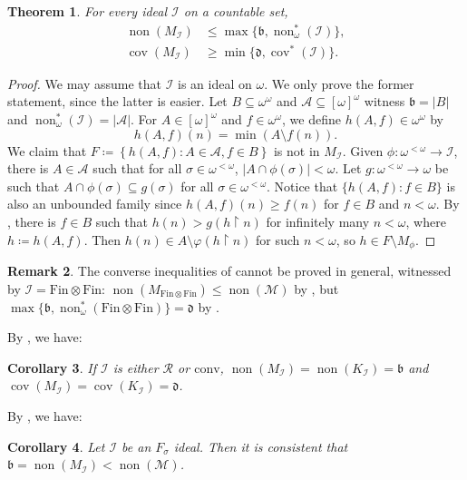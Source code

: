 \documentclass[a4paper,12pt]{amsart}
\newtheorem{thm}{Theorem}
\newtheorem{cor}[thm]{Corollary}
\theoremstyle{definition}
\newtheorem{rem}[thm]{Remark}
\numberwithin{thm}{section}
\numberwithin{equation}{section}
\newcommand{\oo}{{\omega}^\omega}
\newcommand{\ooo}{[{\omega}]^\omega}
\newcommand{\fsq}{\omega^{<\omega}}
\newcommand{\on}{\mathpunct{\upharpoonright}}
\newcommand{\bb}{\mathfrak{b}}
\newcommand{\dd}{\mathfrak{d}}
\DeclareMathOperator{\non}{non}
\DeclareMathOperator{\cov}{cov}
\newcommand{\nonm}{\non(\mathcal{M})}
\newcommand{\I}{\mathscr{I}}
\newcommand{\finfin}{\mathrm{Fin}\otimes\mathrm{Fin}}
\newcommand{\cal}{\mathcal}
\newcommand{\set}[2]
{\left\{{#1}:{#2}\right\}}  %
\newcommand{\mzb}{M}
\newcommand{\mzbi}{\mzb_{\I}}
\newcommand{\conv}{\mathrm{conv}}
\newcommand{\RandomGraph}{\mathcal{R}}
\begin{document}
    \begin{thm}\label{thm:nonmi_leq_max}
        For every ideal $\I$ on a countable set,
        \begin{align*}
            \non(M_\I) &\leq \max\{\bb,\non^*_\omega(\I)\},\\
            \cov(M_\I) &\geq \min\{\dd,\cov^*(\I)\}.
        \end{align*}
    \end{thm}
    \begin{proof}
        We may assume that $\I$ is an ideal on $\omega$. We only prove the former statement, since the latter is easier. Let $B\subseteq\oo$ and $\cal{A}\subseteq\ooo$ witness $\bb=\lvert B\rvert$ and $\non^*_\omega(\I)=\lvert\mathcal{A}\rvert$. 
        For $A\in\ooo$ and $f\in\oo$, we define $h(A,f)\in\oo$ by
        \[
        h(A, f)(n) = \min(A\setminus f(n)).
        \]
        We claim that $F\coloneqq\set{h(A,f)}{A\in\cal{A}, f\in B}$ is not in $\mzbi$. Given $\phi\colon \fsq\to\I$, 
        there is $A\in\cal{A}$ such that for all $\sigma\in\fsq$, $\lvert A\cap \phi(\sigma)\rvert<\omega$. Let $g\colon \fsq\to\omega$ be such that $A\cap \phi(\sigma)\subseteq g(\sigma)$ for all $\sigma\in\omega^{<\omega}$. Notice that $\{h(A,f):f\in B\}$ is also an unbounded family since $h(A,f)(n)\geq f(n)$ for $f\in B$ and $n<\omega$. 
        By , there is $f\in B$ such that $h(n)>g(h\on n)$ for infinitely many $n<\omega$, where $h\coloneqq h(A, f)$. Then $h(n)\in A\setminus \varphi(h\on n)$ for such $n<\omega$, so $h\in F\setminus M_\phi$.
    \end{proof}

    \begin{rem}\label{rem:finfin_b_d}
        The converse inequalities of  cannot be proved in general, witnessed by $\I=\finfin$: $\non(M_{\finfin})\leq\nonm$ by , but $\max\{\bb,\non^*_\omega(\finfin)\}=\dd$ by . 
    \end{rem}

    By , we have:

    \begin{cor}
        If $\I$ is either $\RandomGraph$ or $\conv$, $\non(M_\I) = \non(K_\I) = \bb$ and $\cov(M_\I) = \cov(K_\I) = \dd$.
    \end{cor}
    
    By , we have:
    
    \begin{cor}\label{cor:Fsigma_MI}
        Let $\I$ be an $F_\sigma$ ideal. Then it is consistent that $\bb = \non(M_\I) < \non(\mathcal{M})$. 
    \end{cor}
\end{document}
